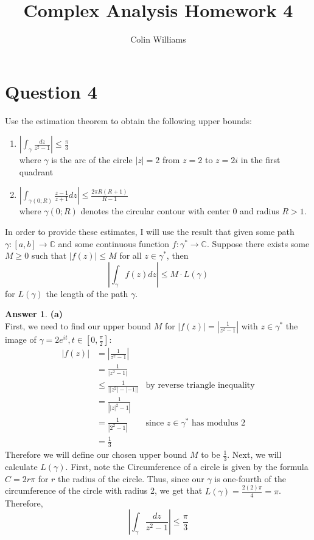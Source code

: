 \documentclass[10pt,a4paper]{article}
\title{Complex Analysis Homework 4}
\author{Colin Williams}
\theoremstyle{definition}
\newtheorem*{answer*}{Answer}
\begin{document}
\maketitle

\section*{Question 4}

Use the estimation theorem to obtain the following upper bounds:
\begin{enumerate}[label = (\alph*)]
\item $\displaystyle \left|\int_{\gamma}\frac{dz}{z^2 - 1}\right| \leq \frac{\pi}{3}$
\\where $\gamma$ is the arc of the circle $|z| = 2$ from $z = 2$ to $z = 2i$ in the first quadrant
\item $\displaystyle \left|\int_{\gamma(0;R)} \frac{z-1}{z+1}dz\right| \leq \frac{2\pi R(R + 1)}{R-1}$
\\where $\gamma(0;R)$ denotes the circular contour with center 0 and radius $R > 1$.
\end{enumerate}
$ $
\\In order to provide these estimates, I will use the result that given some path $\gamma : [a,b] \to \mathbb{C}$ and some continuous function $f: \gamma^* \to \mathbb{C}$. Suppose there exists some $M \geq 0$ such that $|f(z)| \leq M$ for all $z \in \gamma^*$, then
\begin{equation}
\left|\int_{\gamma} f(z)dz\right| \leq M \cdot L(\gamma)
\end{equation}
for $L(\gamma)$ the length of the path $\gamma$.

\begin{answer*}{\textbf{(a)}}
\\First, we need to find our upper bound $M$ for $\displaystyle |f(z)| = \left|\frac{1}{z^2 - 1}\right|$ with $z \in \gamma^*$ the image of $\gamma = 2e^{it}, t \in [0, \frac{\pi}{2}]$:
\begin{align*}
|f(z)| &= \left|\frac{1}{z^2 - 1}\right|\\
&= \frac{1}{|z^2 - 1|}\\
&\leq \frac{1}{\displaystyle \left||z^2| - |-1|\right|}&\text{by reverse triangle inequality}\\
&= \frac{1}{\displaystyle \left||z|^2 - 1\right|}\\
&= \frac{1}{|2^2 - 1|} &\text{since } z \in \gamma^* \text{ has modulus 2}\\
&= \frac{1}{3}
\end{align*}
Therefore we will define our chosen upper bound $M$ to be $\displaystyle \frac{1}{3}$. Next, we will calculate $L(\gamma)$. First, note the Circumference of a circle is given by the formula $C = 2r\pi$ for $r$ the radius of the circle. Thus, since our $\gamma$ is one-fourth of the circumference of the circle with radius 2, we get that $\displaystyle L(\gamma) = \frac{2(2)\pi}{4} = \pi$. Therefore,
\[\boxed{\left|\int_{\gamma} \frac{dz}{z^2 - 1}\right| \leq \frac{\pi}{3}}\]
\end{answer*}
\end{document}

